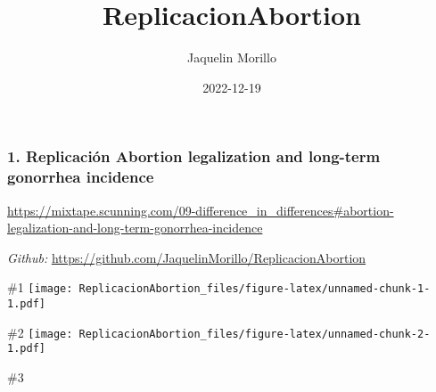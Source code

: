 \documentclass[
]{article}
\title{ReplicacionAbortion}
\author{Jaquelin Morillo}
\date{2022-12-19}
\begin{document}
\maketitle

\hypertarget{replicaciuxf3n-abortion-legalization-and-long-term-gonorrhea-incidence}{%
\subsubsection{1. Replicación Abortion legalization and long-term
gonorrhea
incidence}\label{replicaciuxf3n-abortion-legalization-and-long-term-gonorrhea-incidence}}

\url{https://mixtape.scunning.com/09-difference_in_differences\#abortion-legalization-and-long-term-gonorrhea-incidence}

\emph{Github:}
\url{https://github.com/JaquelinMorillo/ReplicacionAbortion}

\#1
\texttt{[image: ReplicacionAbortion\_files/figure-latex/unnamed-chunk-1-1.pdf]}

\#2
\texttt{[image: ReplicacionAbortion\_files/figure-latex/unnamed-chunk-2-1.pdf]}

\#3
\end{document}
